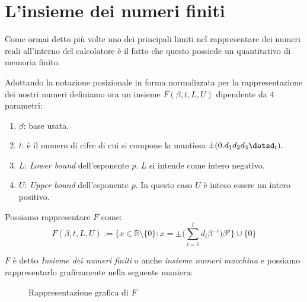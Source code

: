 \documentclass[12pt, a4paper]{book}
\theoremstyle{definition}
\begin{document}
\section{L'insieme dei numeri finiti }
\begin{flushleft}

\par Come ormai detto più volte uno dei principali limiti nel rappresentare dei numeri reali all'interno del calcolatore è il fatto che questo possiede un quantitativo di memoria finito.
\par Adottando la notazione posizionale in forma normalizzata per la rappresentazione dei nostri numeri definiamo ora un insieme $F(\beta, t, L,U)$ dipendente da 4 parametri:

\begin{enumerate}
\item $\beta$: base usata.
\item $t$: è il numero di cifre di cui si compone la mantissa $\pm (0.d_{1}d_{2}d_{3}\dotsd_{t}). $
\item $L$: \textit{Lower bound} dell'esponente $p$.  $L$ si intende come intero negativo.
\item $U$: \textit{Upper bound} dell'esponente $p$.  In questo caso $U$ è inteso essere un intero positivo.
\end{enumerate} 

Possiamo rappresentare $F$ come: 
\[ 
	F(\beta, t, L, U):= 
	\bigg\{ x \in \mathbb{R} \setminus \{0\}: x =  \pm \bigg(\sum_{i = 1}^{t} d_{i} \beta^{-i} \bigg) \beta^{p}  \bigg\} \cup \{0\}
\]

$F$ è detto \textit{Insieme dei numeri finiti} o anche \textit{insieme numeri macchina} e possiamo rappresentarlo graficamente nella seguente maniera: 
\vspace{2cm}
\begin{figure}[h!]
\centering
{}
\caption{Rappresentazione grafica di $F$}
\label{rappresentazione f}
\end{figure}


\end{flushleft}
\end{document}
